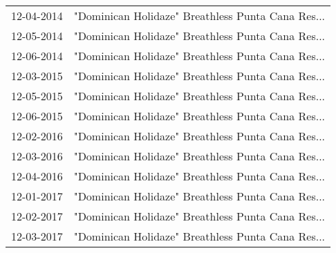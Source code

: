 \begin{supertabular}{ll}
 12-04-2014 &  "Dominican Holidaze" Breathless Punta Cana Res... \\
 12-05-2014 &  "Dominican Holidaze" Breathless Punta Cana Res... \\
 12-06-2014 &  "Dominican Holidaze" Breathless Punta Cana Res... \\
 12-03-2015 &  "Dominican Holidaze" Breathless Punta Cana Res... \\
 12-05-2015 &  "Dominican Holidaze" Breathless Punta Cana Res... \\
 12-06-2015 &  "Dominican Holidaze" Breathless Punta Cana Res... \\
 12-02-2016 &  "Dominican Holidaze" Breathless Punta Cana Res... \\
 12-03-2016 &  "Dominican Holidaze" Breathless Punta Cana Res... \\
 12-04-2016 &  "Dominican Holidaze" Breathless Punta Cana Res... \\
 12-01-2017 &  "Dominican Holidaze" Breathless Punta Cana Res... \\
 12-02-2017 &  "Dominican Holidaze" Breathless Punta Cana Res... \\
 12-03-2017 &  "Dominican Holidaze" Breathless Punta Cana Res... \\
\end{supertabular}
